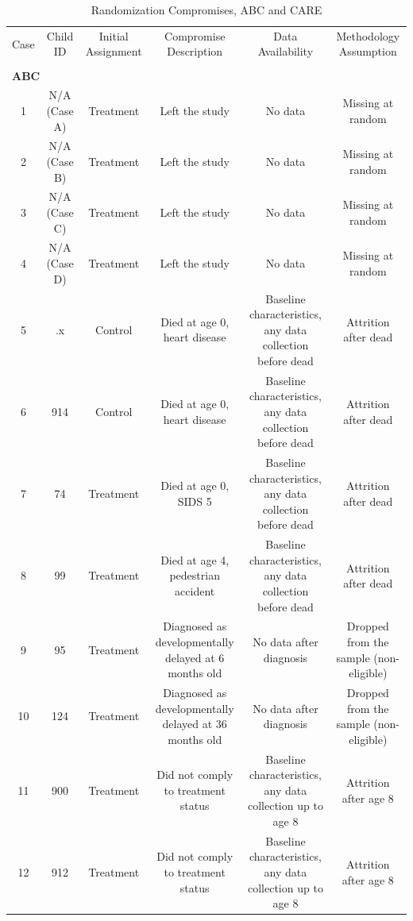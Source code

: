 \begin{appendices}

\begin{table} 
\begin{threeparttable}
\caption{Randomization Compromises, ABC and CARE}
\label{table:compromised}
\centering
\tiny
\begin{tabular}{cccccc} \hline \hline
Case & Child ID & Initial Assignment & Compromise Description & Data Availability & Methodology Assumption \\ \\ \hline
\multicolumn{6}{l}{\textbf{ABC}} \\ 
1 & N/A (Case A) & Treatment & Left the study & No data & Missing at random \\
2 & N/A (Case B) & Treatment & Left the study & No data & Missing at random \\
3 & N/A (Case C) & Treatment & Left the study & No data & Missing at random \\
4 & N/A (Case D)          & Treatment & Left the study & No data & Missing at random \\
5 & .x & Control            & Died at age 0, heart disease & Baseline characteristics, any data collection before dead      & Attrition after dead \\
6 & 914 & Control         & Died at age 0, heart disease & Baseline characteristics, any data collection before dead   & Attrition after dead \\
7 & 74 & Treatment      & Died at age 0, SIDS  5 & Baseline characteristics, any data collection before dead & Attrition after dead \\
8 & 99 & Treatment      & Died at age 4, pedestrian accident & Baseline characteristics, any data collection before dead & Attrition after dead \\
9 & 95   & Treatment       & Diagnosed as developmentally delayed at 6 months old   & No data after diagnosis & Dropped from the sample (non-eligible) \\ 
10 & 124 & Treatment       & Diagnosed as developmentally delayed at 36 months old & No data after diagnosis & Dropped from the sample (non-eligible) \\ 
11   & 900 & Treatment  & Did not comply to treatment status  & Baseline characteristics, any data collection up to age 8 & Attrition after age 8  \\
12 & 912 & Treatment  & Did not comply to treatment status  & Baseline characteristics, any data collection up to age 8 & Attrition after age 8 \\

\end{tabular}
\end{threeparttable}
\end{table}
\end{appendices}

